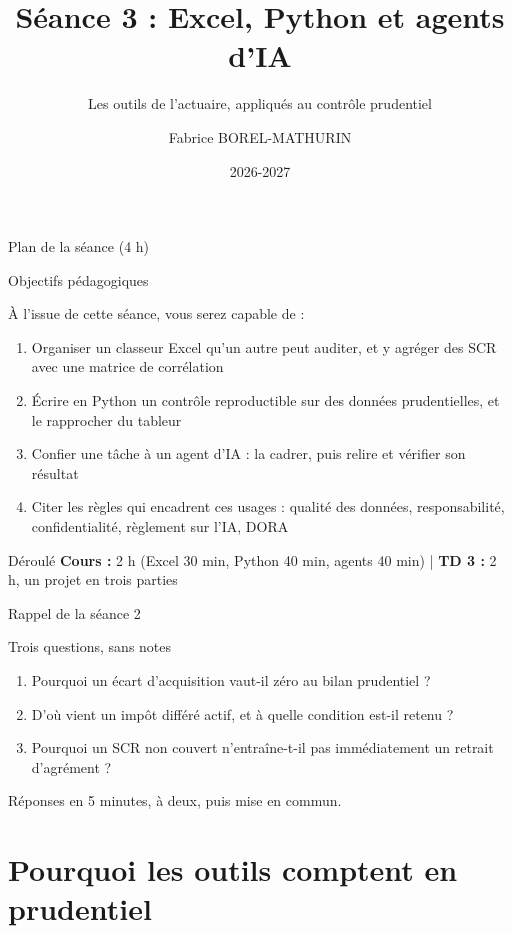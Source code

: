 \documentclass[10pt,aspectratio=169]{beamer}
\title[Séance 3 -- Excel, Python et agents d'IA]{Séance 3 : Excel, Python et agents d'IA}
\subtitle{Les outils de l'actuaire, appliqués au contrôle prudentiel}
\author[F. Borel-Mathurin]{Fabrice BOREL-MATHURIN}
\institute[ACPR-DEAR et SAF Lyon 1]{
    ACPR - DEAR\\
    et\\
    Laboratoire SAF Université Claude Bernard Lyon 1
}
\date{2026-2027}
\begin{document}
\frame{\titlepage}

\begin{frame}{Plan de la séance (4 h)}
\tableofcontents
\end{frame}

\begin{frame}{Objectifs pédagogiques}
\begin{block}{À l'issue de cette séance, vous serez capable de :}
\begin{enumerate}
  \item Organiser un classeur Excel qu'un autre peut auditer, et y agréger des SCR avec une matrice de corrélation
  \item Écrire en Python un contrôle reproductible sur des données prudentielles, et le rapprocher du tableur
  \item Confier une tâche à un agent d'IA : la cadrer, puis relire et vérifier son résultat
  \item Citer les règles qui encadrent ces usages : qualité des données, responsabilité, confidentialité, règlement sur l'IA, DORA
\end{enumerate}
\end{block}
\vspace{0.3cm}
\begin{alertblock}{Déroulé}
\textbf{Cours :} 2 h (Excel 30 min, Python 40 min, agents 40 min) \quad | \quad
\textbf{TD 3 :} 2 h, un projet en trois parties
\end{alertblock}
\end{frame}

\begin{frame}{Rappel de la séance 2}
\begin{block}{Trois questions, sans notes}
\begin{enumerate}
  \item Pourquoi un écart d'acquisition vaut-il zéro au bilan prudentiel ?
  \item D'où vient un impôt différé actif, et à quelle condition est-il retenu ?
  \item Pourquoi un SCR non couvert n'entraîne-t-il pas immédiatement un retrait d'agrément ?
\end{enumerate}
\end{block}
\vspace{0.2cm}
\small Réponses en 5 minutes, à deux, puis mise en commun.
\end{frame}

\section{Pourquoi les outils comptent en prudentiel}
\end{document}
